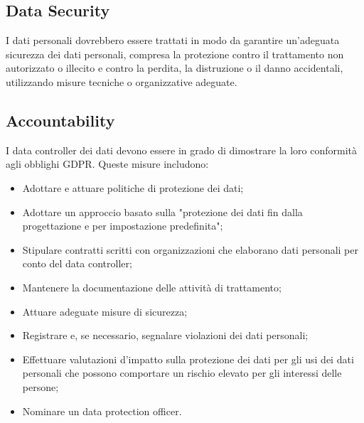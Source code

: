 \subsection{Data Security}
I dati personali dovrebbero essere trattati in modo da garantire un'adeguata sicurezza dei dati personali, compresa la protezione contro il trattamento non autorizzato o illecito e contro la perdita, la distruzione o il danno accidentali, utilizzando misure tecniche o organizzative adeguate.

\subsection{Accountability}
I data controller dei dati devono essere in grado di dimostrare la loro conformità agli obblighi GDPR. Queste misure includono:
\begin{itemize}
    \item Adottare e attuare politiche di protezione dei dati;
    \item Adottare un approccio basato sulla "protezione dei dati fin dalla progettazione e per impostazione predefinita";
    \item Stipulare contratti scritti con organizzazioni che elaborano dati personali per conto del data controller;
    \item Mantenere la documentazione delle attività di trattamento;
    \item Attuare adeguate misure di sicurezza;
    \item Registrare e, se necessario, segnalare violazioni dei dati personali;
    \item Effettuare valutazioni d'impatto sulla protezione dei dati per gli usi dei dati personali che possono comportare un rischio elevato per gli interessi delle persone;
    \item Nominare un data protection officer.
\end{itemize}

